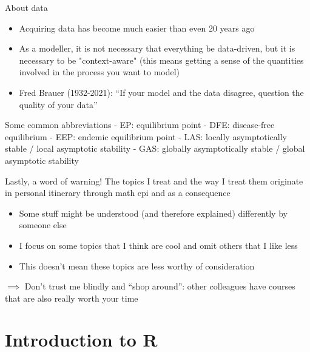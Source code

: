 \documentclass[aspectratio=169]{beamer}\usepackage[]{graphicx}\usepackage[]{xcolor}
\begin{document}
\begin{frame}{About data}
	\begin{itemize}
		\item Acquiring data has become much easier than even 20 years ago
		\vfill
		\item As a modeller, it is not necessary that everything be data-driven, but it is necessary to be "context-aware" (this means getting a sense of the quantities involved in the process you want to model)
		\vfill
		\item Fred Brauer (1932-2021): ``If your model and the data disagree, question the quality of your data''
	\end{itemize}
\end{frame}


\begin{frame}{Some common abbreviations}
- EP: equilibrium point
\vfill
- DFE: disease-free equilibrium
\vfill
- EEP: endemic equilibrium point
\vfill
- LAS: locally asymptotically stable / local asymptotic stability
\vfill
- GAS: globally asymptotically stable / global asymptotic stability
\end{frame}

\begin{frame}{Lastly, a word of warning!}
The topics I treat and the way I treat them originate in  personal itinerary through math epi and as a consequence
	\begin{itemize}
		\item Some stuff might be understood (and therefore explained) differently by someone else
		\item I focus on some topics that I think are cool and omit others that I like less
		\item This doesn't mean these topics are less worthy of consideration
	\end{itemize}
	\vfill
	$\implies$ Don't trust me blindly and ``shop around'': other colleagues have courses that are also really worth your time
\end{frame}

\section{Introduction to R}
\end{document}

